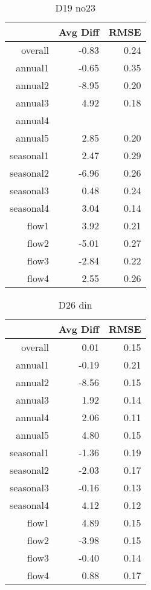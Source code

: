 \begin{table}[H]
\centering
\begin{tabular}{rrr}
  \hline
 & Avg Diff & RMSE \\ 
  \hline
overall & -0.83 & 0.24 \\ 
  annual1 & -0.65 & 0.35 \\ 
  annual2 & -8.95 & 0.20 \\ 
  annual3 & 4.92 & 0.18 \\ 
  annual4 &  &  \\ 
  annual5 & 2.85 & 0.20 \\ 
  seasonal1 & 2.47 & 0.29 \\ 
  seasonal2 & -6.96 & 0.26 \\ 
  seasonal3 & 0.48 & 0.24 \\ 
  seasonal4 & 3.04 & 0.14 \\ 
  flow1 & 3.92 & 0.21 \\ 
  flow2 & -5.01 & 0.27 \\ 
  flow3 & -2.84 & 0.22 \\ 
  flow4 & 2.55 & 0.26 \\ 
   \hline
\end{tabular}
\caption{D19 no23} 
\end{table}
\begin{table}[H]
\centering
\begin{tabular}{rrr}
  \hline
 & Avg Diff & RMSE \\ 
  \hline
overall & 0.01 & 0.15 \\ 
  annual1 & -0.19 & 0.21 \\ 
  annual2 & -8.56 & 0.15 \\ 
  annual3 & 1.92 & 0.14 \\ 
  annual4 & 2.06 & 0.11 \\ 
  annual5 & 4.80 & 0.15 \\ 
  seasonal1 & -1.36 & 0.19 \\ 
  seasonal2 & -2.03 & 0.17 \\ 
  seasonal3 & -0.16 & 0.13 \\ 
  seasonal4 & 4.12 & 0.12 \\ 
  flow1 & 4.89 & 0.15 \\ 
  flow2 & -3.98 & 0.15 \\ 
  flow3 & -0.40 & 0.14 \\ 
  flow4 & 0.88 & 0.17 \\ 
   \hline
\end{tabular}
\caption{D26 din} 
\end{table}
